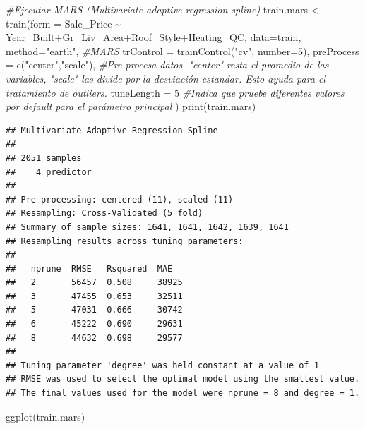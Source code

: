 \documentclass[
]{article}
\newenvironment{Shaded}{\begin{snugshade}}{\end{snugshade}}
\newcommand{\AttributeTok}[1]{\textcolor[rgb]{0.77,0.63,0.00}{#1}}
\newcommand{\CommentTok}[1]{\textcolor[rgb]{0.56,0.35,0.01}{\textit{#1}}}
\newcommand{\DecValTok}[1]{\textcolor[rgb]{0.00,0.00,0.81}{#1}}
\newcommand{\FunctionTok}[1]{\textcolor[rgb]{0.00,0.00,0.00}{#1}}
\newcommand{\NormalTok}[1]{#1}
\newcommand{\OtherTok}[1]{\textcolor[rgb]{0.56,0.35,0.01}{#1}}
\newcommand{\SpecialCharTok}[1]{\textcolor[rgb]{0.00,0.00,0.00}{#1}}
\newcommand{\StringTok}[1]{\textcolor[rgb]{0.31,0.60,0.02}{#1}}
\begin{document}
\begin{Shaded}
\begin{Highlighting}[]
\CommentTok{\#Ejecutar MARS (Multivariate adaptive regression spline)}
\NormalTok{train.mars }\OtherTok{\textless{}{-}} \FunctionTok{train}\NormalTok{(}\AttributeTok{form =}\NormalTok{ Sale\_Price }\SpecialCharTok{\textasciitilde{}}\NormalTok{ Year\_Built}\SpecialCharTok{+}\NormalTok{Gr\_Liv\_Area}\SpecialCharTok{+}\NormalTok{Roof\_Style}\SpecialCharTok{+}\NormalTok{Heating\_QC, }
                    \AttributeTok{data=}\NormalTok{train, }
                    \AttributeTok{method=}\StringTok{"earth"}\NormalTok{, }\CommentTok{\#MARS}
                    \AttributeTok{trControl =} \FunctionTok{trainControl}\NormalTok{(}\StringTok{"cv"}\NormalTok{, }\AttributeTok{number=}\DecValTok{5}\NormalTok{),}
                    \AttributeTok{preProcess =} \FunctionTok{c}\NormalTok{(}\StringTok{"center"}\NormalTok{,}\StringTok{"scale"}\NormalTok{), }\CommentTok{\#Pre{-}procesa datos. "center" resta el promedio de las variables, "scale" las divide por la desviación estandar. Esto ayuda para el tratamiento de outliers.}
                    \AttributeTok{tuneLength =} \DecValTok{5} \CommentTok{\#Indica que pruebe diferentes valores por default para el parámetro principal}
\NormalTok{)}
\FunctionTok{print}\NormalTok{(train.mars)}
\end{Highlighting}
\end{Shaded}

\begin{verbatim}
## Multivariate Adaptive Regression Spline 
## 
## 2051 samples
##    4 predictor
## 
## Pre-processing: centered (11), scaled (11) 
## Resampling: Cross-Validated (5 fold) 
## Summary of sample sizes: 1641, 1641, 1642, 1639, 1641 
## Resampling results across tuning parameters:
## 
##   nprune  RMSE   Rsquared  MAE  
##   2       56457  0.508     38925
##   3       47455  0.653     32511
##   5       47031  0.666     30742
##   6       45222  0.690     29631
##   8       44632  0.698     29577
## 
## Tuning parameter 'degree' was held constant at a value of 1
## RMSE was used to select the optimal model using the smallest value.
## The final values used for the model were nprune = 8 and degree = 1.
\end{verbatim}

\begin{Shaded}
\begin{Highlighting}[]
\FunctionTok{ggplot}\NormalTok{(train.mars)}
\end{Highlighting}
\end{Shaded}
\end{document}
